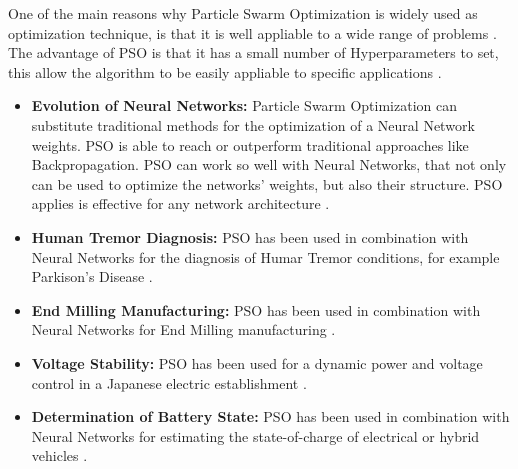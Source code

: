 One of the main reasons why Particle Swarm Optimization is widely used as optimization technique, is that it is well appliable to a wide range of problems \cite{Tesi-3.4}.
The advantage of PSO is that it has a small number of Hyperparameters to set, this allow the algorithm to be easily appliable to specific applications \cite{Tesi-3.4} \cite{Tesi-3.1} \cite{Tesi-3.3} \cite{Tesi-3.5}.
\begin{itemize}[itemsep=0.1cm]
    \item \textbf{Evolution of Neural Networks:} Particle Swarm Optimization can substitute traditional methods for the optimization of a Neural Network weights.
	PSO is able to reach or outperform traditional approaches like Backpropagation.
	PSO can work so well with Neural Networks, that not only can be used to optimize the networks' weights, but also their structure. PSO applies is effective for any network architecture \cite{Tesi-3.4}.
	\item \textbf{Human Tremor Diagnosis:} PSO has been used in combination with Neural Networks for the diagnosis of Humar Tremor conditions, for example Parkison's Disease \cite{Tesi-3.4}.
	\item \textbf{End Milling Manufacturing:} PSO has been used in combination with Neural Networks for End Milling manufacturing \cite{Tesi-3.4}.
	\item \textbf{Voltage Stability:} PSO has been used for a dynamic power and voltage control in a Japanese electric establishment \cite{Tesi-3.4}.
	\item \textbf{Determination of Battery State:} PSO has been used in combination with Neural Networks for estimating the state-of-charge of electrical or hybrid vehicles \cite{Tesi-3.4}.
\end{itemize}

